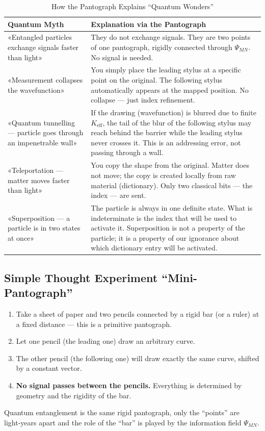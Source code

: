 \documentclass[12pt,a4paper]{article}
\begin{document}
	\begin{table}[htbp]
		\centering
		\caption{How the Pantograph Explains “Quantum Wonders”}
		\label{tab:myths}
		\begin{tabular}{|p{4.5cm}|p{9cm}|}
			\hline
			\textbf{Quantum Myth} & \textbf{Explanation via the Pantograph} \\
			\hline
			«Entangled particles exchange signals faster than light» & They do not exchange signals. They are two points of one pantograph, rigidly connected through \(\Psi_{MN}\). No signal is needed. \\
			\hline
			«Measurement collapses the wavefunction» & You simply place the leading stylus at a specific point on the original. The following stylus automatically appears at the mapped position. No collapse — just index refinement. \\
			\hline
			«Quantum tunnelling — particle goes through an impenetrable wall» & If the drawing (wavefunction) is blurred due to finite \(K_{\mathrm{eff}}\), the tail of the blur of the following stylus may reach behind the barrier while the leading stylus never crosses it. This is an addressing error, not passing through a wall. \\
			\hline
			«Teleportation — matter moves faster than light» & You copy the shape from the original. Matter does not move; the copy is created locally from raw material (dictionary). Only two classical bits — the index — are sent. \\
			\hline
			«Superposition — a particle is in two states at once» & The particle is always in one definite state. What is indeterminate is the index that will be used to activate it. Superposition is not a property of the particle; it is a property of our ignorance about which dictionary entry will be activated. \\
			\hline
		\end{tabular}
	\end{table}
	
	\subsection{Simple Thought Experiment “Mini-Pantograph”}
	
	\begin{enumerate}
		\item Take a sheet of paper and two pencils connected by a rigid bar (or a ruler) at a fixed distance — this is a primitive pantograph.
		\item Let one pencil (the leading one) draw an arbitrary curve.
		\item The other pencil (the following one) will draw exactly the same curve, shifted by a constant vector.
		\item \textbf{No signal passes between the pencils.} Everything is determined by geometry and the rigidity of the bar.
	\end{enumerate}
	Quantum entanglement is the same rigid pantograph, only the “points” are light‑years apart and the role of the “bar” is played by the information field \(\Psi_{MN}\).
	
\end{document}
